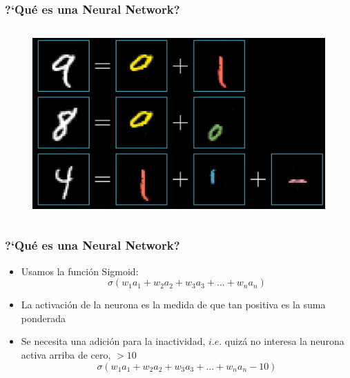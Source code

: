 \documentclass[10pt]{beamer}
\begin{document}
\begin{frame}
\frametitle{?`Qu\'e es una Neural Network?}

\begin{columns}
\begin{column}{\textwidth}
  \begin{figure}
  \includegraphics[scale=0.155]{./Figures/descomp_num.png}
 \end{figure}  
\end{column}%
\end{columns}
\end{frame}



\begin{frame}
\frametitle{?`Qu\'e es una Neural Network?}
\begin{beamerboxesrounded}[upper=uppercolor, lower=lowercolor, shadow=true]{} 

\begin{itemize}
\item Usamos la funci\'on Sigmoid:
\begin{equation*}
\sigma(w_1 a_1+w_2 a_2+w_3 a_3+...+w_n a_n)
\end{equation*}

\item La activaci\'on de la neurona es la medida de que tan positiva es la suma ponderada 
\item Se necesita una adici\'on para la inactividad, $i.e.$ quiz\'a  no interesa la neurona activa arriba de cero, $>10$
\begin{equation*}
\sigma(w_1 a_1+w_2 a_2+w_3 a_3+...+w_n a_n-10)
\end{equation*}

 
\end{itemize}
\end{beamerboxesrounded}

\end{frame}
\end{document}
